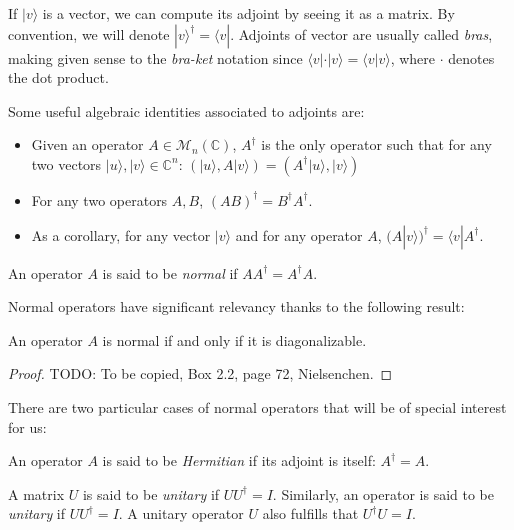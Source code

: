 If $|v\rangle$ is a vector, we can compute its adjoint by seeing it as a matrix. By convention, we will denote $|v\rangle^\dagger = \langle v|$. Adjoints of vector are usually called \emph{bras}, making given sense to the \emph{bra-ket} notation since $\langle v| \cdot |v\rangle = \langle v|v\rangle$, where $\cdot$ denotes the dot product.

Some useful algebraic identities associated to adjoints are:

\begin{itemize}
	\item Given an operator $A \in \mathcal{M}_{n}(\mathds{C})$, $A^\dagger$ is the only operator such that for any two vectors $|u\rangle, |v\rangle \in \mathds{C}^n$: $( |u\rangle, A|v\rangle) = ( A^\dagger |u\rangle, |v\rangle)$
	\item For any two operators $A,B$, $(AB)^\dagger = B^\dagger A^\dagger$.
	\item As a corollary, for any vector $|v\rangle$ and for any operator $A$, $(A|v\rangle)^\dagger = \langle v|A^\dagger$.
\end{itemize}

\begin{definition}
	An operator $A$ is said to be \emph{normal} if $AA^\dagger = A^\dagger A$.
\end{definition}

Normal operators have significant relevancy thanks to the following result:

\begin{theorem}
	An operator $A$ is normal if and only if it is diagonalizable.
\end{theorem}
\begin{proof}
	TODO: To be copied, Box 2.2, page 72, Nielsenchen.
\end{proof}

There are two particular cases of normal operators that will be of special interest for us:

\begin{definition}
	An operator $A$ is said to be \emph{Hermitian} if its adjoint is itself: $A^\dagger = A$.
\end{definition}

\begin{definition}
	A matrix $U$ is said to be \emph{unitary} if $UU^\dagger = I$. Similarly, an operator is said to be \emph{unitary} if $UU^\dagger = I$. A unitary operator $U$ also fulfills that $U^\dagger U = I$.
\end{definition}

